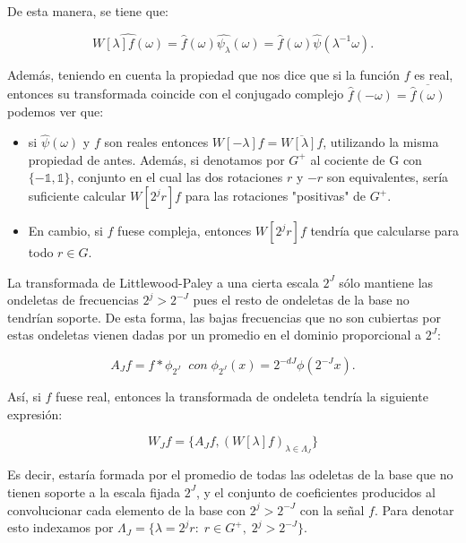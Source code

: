 De esta manera, se tiene que: 

$$\widehat{W[\lambda]f(\omega)}=\widehat{f}(\omega)\widehat{\psi_\lambda}(\omega)=\widehat{f}(\omega)\widehat{\psi}(\lambda^{-1}\omega).$$

\noindent Además, teniendo en cuenta la propiedad que nos dice que si la función $f$ es real, entonces su transformada coincide con el conjugado complejo $\widehat{f}(-\omega)=\overline{\widehat{f}(\omega)}$ podemos ver que: 

\begin{itemize}
  \item si $\widehat{\psi}(\omega)$ y $f$ son reales entonces $W[-\lambda]f= \overline{W[\lambda]f}$, utilizando la misma propiedad de antes. Además, si denotamos por $G^{+}$ al cociente de G con $\lbrace-\mathbb{1},\mathbb{1}\rbrace$, conjunto en el cual las dos rotaciones $r$ y $-r$ son equivalentes, sería suficiente calcular $W[2^jr]f$ para las rotaciones "positivas" de $G^{+}$.
  \item En cambio, si $f$ fuese compleja, entonces $W[2^jr]f$ tendría que calcularse para todo $r \in G$.
\end{itemize}

\medskip
 
\noindent La transformada de Littlewood-Paley a una cierta escala $2^J$ sólo mantiene las ondeletas de frecuencias $2^j>2^{-J}$ pues el resto de ondeletas de la base no tendrían soporte. De esta forma, las bajas frecuencias que no son cubiertas por estas ondeletas vienen dadas por un promedio en el dominio proporcional a $2^J$:

\begin{equation}
  A_Jf=f \ast \phi_ {2^J} \; \; con \; \phi_ {2^J}(x)=2^{-dJ} \phi(2^{-J}x).
\end{equation}

\medskip

\noindent Así, si $f$ fuese real, entonces la transformada de ondeleta tendría la siguiente expresión: 

$$W_J f=\lbrace A_Jf,(W[\lambda]f)_{\lambda \in \Lambda_J} \rbrace$$ 

\noindent Es decir, estaría formada por el promedio de todas las odeletas de la base que no tienen soporte a la escala fijada $2^J$, y el conjunto de coeficientes producidos al convolucionar cada elemento de la base con $2^j>2^{-J}$ con la señal $f$. Para denotar esto indexamos por $\Lambda_J=\lbrace \lambda=2^jr:\;r\in G^{+}, \; 2^j>2^{-J}\rbrace$. 

\medskip

